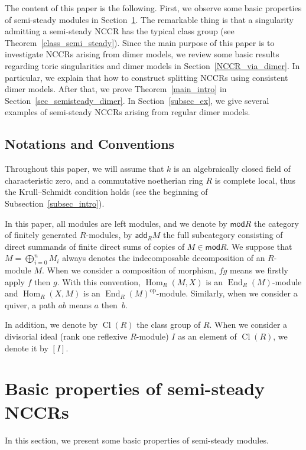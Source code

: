 \documentclass[ALCO,ThmDefs,Unicode]{cedram}
\DeclareMathOperator{\op}{op}
\DeclareMathOperator{\Hom}{Hom}
\DeclareMathOperator{\Cl}{Cl}
\DeclareMathOperator{\End}{End}
\newcommand{\add}{\mathsf{add}}
\newcommand{\mc}{\mathsf{mod}}
\begin{document}
The content of this paper is the following. First, we observe some basic properties of semi-steady modules in Section~\ref{sec_semisteady}. The remarkable thing is that a singularity admitting a semi-steady NCCR has the typical class group (see Theorem~\ref{class_semi_steady}). Since the main purpose of this paper is to investigate NCCRs arising from dimer models, we review some basic results regarding toric singularities and dimer models in Section~\ref{NCCR_via_dimer}. In particular, we explain that how to construct splitting NCCRs using consistent dimer models. After that, we prove Theorem~\ref{main_intro} in Section~\ref{sec_semisteady_dimer}. In Section~\ref{subsec_ex}, we give several examples of semi-steady NCCRs arising from regular dimer models.

\subsection*{Notations and Conventions}

Throughout this paper, we will assume that $k$ is an algebraically closed field of characteristic zero, and a commutative noetherian ring $R$ is complete local, thus the Krull--Schmidt condition holds (see the beginning of Subsection~\ref{subsec_intro}).

In this paper, all modules are left modules, and we denote by $\mc R$ the category of finitely generated $R$-modules, by $\add_RM$ the full subcategory consisting of direct summands of finite direct sums of copies of $M\in \mc R$. We suppose that $M=\bigoplus^n_{i=0}M_i$ always denotes the indecomposable decomposition of an $R$-module $M$. When we consider a composition of morphism, $fg$ means we firstly apply $f$ then $g$. With this convention, $\Hom_R(M, X)$ is an $\End_R(M)$-module and $\Hom_R(X, M)$ is an $\End_R(M)^{\op}$-module. Similarly, when we consider a quiver, a path $ab$ means $a$ then~$b$.

In addition, we denote by $\Cl(R)$ the class group of $R$. When we consider a divisorial ideal (rank one reflexive $R$-module) $I$ as an element of $\Cl(R)$, we denote it by $[I]$.


\section{Basic properties of semi-steady NCCRs}\label{sec_semisteady}

In this section, we present some basic properties of semi-steady modules.
\end{document}
